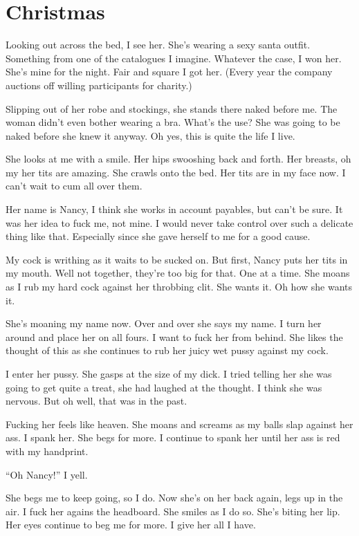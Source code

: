 \section{Christmas}
 
Looking out across the bed, I see her. She’s 
wearing a sexy santa outfit. Something from 
one of the catalogues I imagine. Whatever 
the case, I won her. She’s mine for the night. 
Fair and square I got her. (Every year the 
company auctions off willing participants 
for charity.) 

     Slipping out of her robe and stockings, 
she stands there naked before me. The 
woman didn’t even bother wearing a bra. 
What’s the use? She was going to be naked 
before she knew it anyway. Oh yes, this is 
quite the life I live. 

     She looks at me with a smile. Her hips 
swooshing back and forth. Her breasts, oh 
my her tits are amazing. She crawls onto the 
bed. Her tits are in my face now. I can’t wait 
to cum all over them. 

     Her name is Nancy, I think she works in 
account payables, but can’t be sure. It was 
her idea to fuck me, not mine. I would never 
take control over such a delicate thing like 
that. Especially since she gave herself to me 
for a good cause. 

     My cock is writhing as it waits to be 
sucked on. But first, Nancy puts her tits in 
my mouth. Well not together, they’re too big 
for that. One at a time. She moans as I rub 
my hard cock against her throbbing clit. She 
wants it. Oh how she wants it. 

     She’s moaning my name now. Over and 
over she says my name. I turn her around 
and place her on all fours. I want to fuck her 
from behind. She likes the thought of this as 
she continues to rub her juicy wet pussy 
against my cock. 

     I enter her pussy. She gasps at the size of 
my dick. I tried telling her she was going to 
get quite a treat, she had laughed at the 
thought. I think she was nervous. But oh 
well, that was in the past. 

     Fucking her feels like heaven. She moans 
and screams as my balls slap against her 
ass. I spank her. She begs for more. I 
continue to spank her until her ass is red 
with my handprint. 

     “Oh Nancy!” I yell. 

     She begs me to keep going, so I do. Now 
she’s on her back again, legs up in the air. I 
fuck her agains the headboard. She smiles 
as I do so. She’s biting her lip. Her eyes 
continue to beg me for more. I give her all I 
have. 

